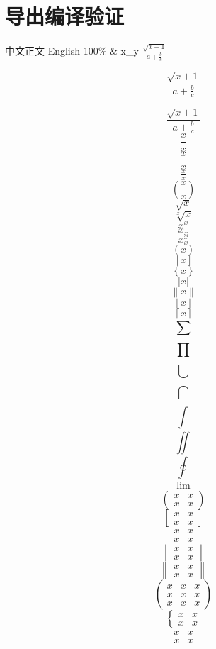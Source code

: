 \documentclass[UTF8,fontset=fandol,scheme=plain]{ctexart}
\begin{document}
\section*{导出编译验证}

中文正文 English 100\% \& x\_y \(\frac{\sqrt{x+1}}{a+\frac{b}{c}}\)


\begin{equation}
\frac{\sqrt{x+1}}{a+\frac{b}{c}}
\end{equation}

\begin{equation*}
\frac{\sqrt{x+1}}{a+\frac{b}{c}}
\end{equation*}
\[\frac{x}{x}\]
\[\dfrac{x}{x}\]
\[\tfrac{x}{x}\]
\[\binom{x}{x}\]
\[\sqrt{x}\]
\[\sqrt[x]{x}\]
\[{x}^{x}\]
\[{x}_{x}\]
\[{x}_{x}^{x}\]
\[\left( x\right)\]
\[\left[ x\right]\]
\[\left\{ x\right\}\]
\[\left| x\right|\]
\[\left\lVert x\right\rVert\]
\[\left\lfloor x\right\rfloor\]
\[\left\lceil x\right\rceil\]
\[\sum_{}^{} \]
\[\prod_{}^{} \]
\[\bigcup_{}^{} \]
\[\bigcap_{}^{} \]
\[\int_{}^{} \]
\[\iint_{}^{} \]
\[\oint_{}^{} \]
\[\lim_{} \]
\[\begin{pmatrix}x&x\\x&x\end{pmatrix}\]
\[\begin{bmatrix}x&x\\x&x\end{bmatrix}\]
\[\begin{matrix}x&x\\x&x\end{matrix}\]
\[\begin{vmatrix}x&x\\x&x\end{vmatrix}\]
\[\begin{Vmatrix}x&x\\x&x\end{Vmatrix}\]
\[\begin{pmatrix}x&x&x\\x&x&x\\x&x&x\end{pmatrix}\]
\[\begin{cases}x&x\\x&x\end{cases}\]
\[\begin{aligned}x&x\\x&x\end{aligned}\]
\end{document}

